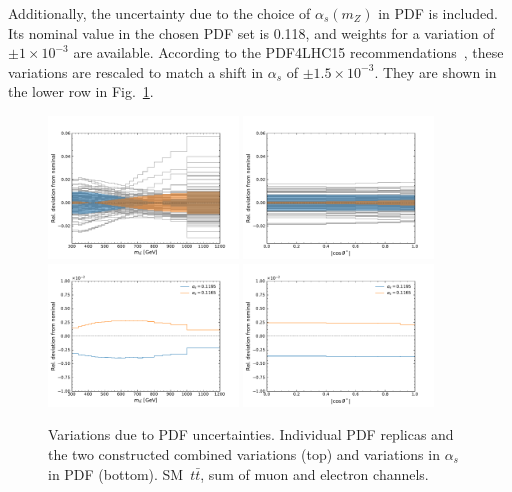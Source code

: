 Additionally, the uncertainty due to the choice of $\alpha_s(m_Z)$ in PDF is included.
Its nominal value in the chosen PDF set is 0.118, and weights for a variation of $\pm 1\times 10^{-3}$ are available.
According to the PDF4LHC15 recommendations~\cite{Butterworth:2015oua}, these variations are rescaled to match a shift in $\alpha_s$ of $\pm 1.5\times 10^{-3}$.
They are shown in the lower row in Fig.~\ref{Fig:SystPDF}.

\begin{figure}
  \centering
  \includegraphics[width=0.45\textwidth]{fig/chapt7/syst/PDF/PDF-mtt.pdf}
  \includegraphics[width=0.45\textwidth]{fig/chapt7/syst/PDF/PDF-cosTheta.pdf} \\
  \includegraphics[width=0.45\textwidth]{fig/chapt7/syst/PDF/alphaS-mtt.pdf}
  \includegraphics[width=0.45\textwidth]{fig/chapt7/syst/PDF/alphaS-cosTheta.pdf}
  \caption{Variations due to PDF uncertainties. Individual PDF replicas and the two constructed combined variations (top) and variations in $\alpha_s$ in PDF (bottom). SM~$t\bar t$, sum of muon and electron channels.}
  \label{Fig:SystPDF}
\end{figure}

